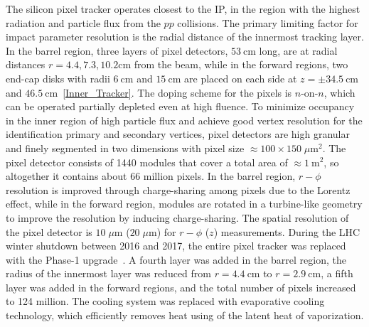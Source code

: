 The silicon pixel tracker operates closest to the IP, in the region with the highest radiation and particle flux from the $pp$ collisions.
The primary limiting factor for impact parameter resolution is the radial distance of the innermost tracking layer.
In the barrel region, three layers of pixel detectors, $\SI{53}{\cm}$ long, are at radial distances $r = 4.4, 7.3, 10.2 \si{\cm}$ from the beam, while in the forward regions, two end-cap disks with radii $\SI{6}{\cm}$ and $\SI{15}{\cm}$ are placed on each side at $z = \pm \SI{34.5}{\cm}$ and $\SI{46.5}{\cm}$~\ref{Inner_Tracker}.
The doping scheme for the pixels is $n$-on-$n$, which can be operated partially depleted even at high fluence.
To minimize occupancy in the inner region of high particle flux and achieve good vertex resolution for the identification primary and secondary vertices, pixel detectors are high granular and finely segmented in two dimensions with pixel size $\approx 100 \times 150 \; \mu \si{\m \squared}$.
The pixel detector consists of 1440 modules that cover a total area of $\approx \SI{1}{\m \squared}$, so altogether it contains about 66 million pixels.
In the barrel region, $r-\phi$ resolution is improved through charge-sharing among pixels due to the Lorentz effect, while in the forward region, modules are rotated in a turbine-like geometry to improve the resolution by inducing charge-sharing.
The spatial resolution of the pixel detector is $10 \; \mu \si{\m}$ ($20 \; \mu \si{\m}$) for $r-\phi$ ($z$) measurements.
During the LHC winter shutdown between 2016 and 2017, the entire pixel tracker was replaced with the Phase-1 upgrade~\cite{Lipinski_2017}.
A fourth layer was added in the barrel region, the radius of the innermost layer was reduced from $r = \SI{4.4}{\cm}$ to $r = \SI{2.9}{\cm}$, a fifth layer was added in the forward regions, and the total number of pixels increased to 124 million.
The cooling system was replaced with evaporative  cooling technology, which efficiently removes heat using of the latent heat of vaporization.

